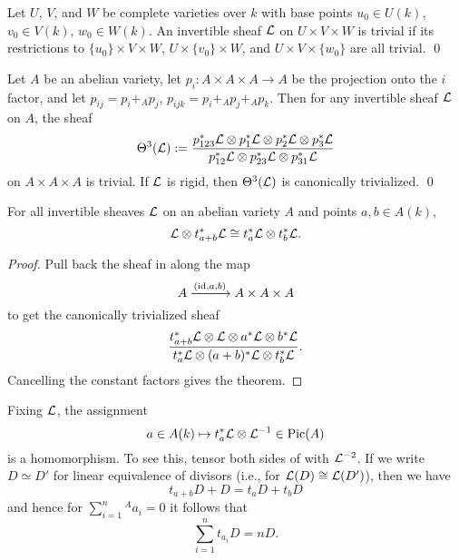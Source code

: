 \begin{theorem}\label{TheoremOfTheCube}
Let $U$, $V$, and $W$ be complete varieties over $k$ with base points $u_0 \in U(k)$, $v_0 \in V(k)$, $w_0 \in W(k)$.  An invertible sheaf $\mathcal{L}$ on $U \times V \times W$ is trivial if its restrictions to $\{u_0\} \times V \times W$, $U \times \{v_0\} \times W$, and $U \times V \times \{w_0\}$ are all trivial. \qed
\end{theorem}

\begin{corollary}\label{Theta3IsTrivial}
Let $A$ be an abelian variety, let $p_i: A \times A \times A \to A$ be the projection onto the $i${\th} factor, and let $p_{ij} = p_i +_A p_j$, $p_{ijk} = p_i +_A p_j +_A p_k$.  Then for any invertible sheaf $\mathcal{L}$ on $A$, the sheaf \[\Theta^3(\mathcal{L}) := \frac{p_{123}^* \mathcal{L} \otimes p_1^* \mathcal{L} \otimes p_2^* \mathcal{L} \otimes p_3^* \mathcal{L}}{p_{12}^* \mathcal{L} \otimes p_{23}^* \mathcal{L} \otimes p_{31}^* \mathcal{L}}\] on $A \times A \times A$ is trivial.  If $\mathcal{L}$ is rigid, then $\Theta^3(\mathcal{L})$ is canonically trivialized. \qed
\end{corollary}

\begin{theorem}\label{TheoremOfTheSquare}
For all invertible sheaves $\mathcal{L}$ on an abelian variety $A$ and points $a, b \in A(k)$, \[\mathcal{L} \otimes t_{a+b}^* \mathcal{L} \cong t_a^* \mathcal{L} \otimes t_b^* \mathcal{L}.\]
\end{theorem}
\begin{proof}
Pull back the sheaf in  along the map \[A \xrightarrow{(\mathrm{id}, a, b)} A \times A \times A\] to get the canonically trivialized sheaf \[\frac{t_{a+b}^* \mathcal{L} \otimes \mathcal{L} \otimes a^* \mathcal{L} \otimes b^* \mathcal{L}}{t_a^* \mathcal{L} \otimes (a+b)^* \mathcal{L} \otimes t_b^* \mathcal{L}}.\]  Cancelling the constant factors gives the theorem.
\end{proof}

\begin{remark}
Fixing $\mathcal{L}$, the assignment \[a \in A(k) \mapsto t_a^* \mathcal{L} \otimes \mathcal{L}^{-1} \in \operatorname{Pic}(A)\] is a homomorphism.  To see this, tensor both sides of  with $\mathcal{L}^{-2}$.  If we write $D \simeq D'$ for linear equivalence of divisors (i.e., for $\mathcal{L}(D) \cong \mathcal{L}(D')$), then we have \[t_{a+b} D + D = t_a D + t_b D\] and hence for $\sum_{i=1}^n{}^A a_i = 0$ it follows that \[\sum_{i=1}^n t_{a_i} D = nD.\]
\end{remark}

